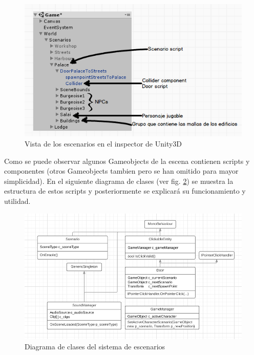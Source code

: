 \begin{figure}[H]
\begin{center}
\includegraphics[scale=1]{imagenes/unityScenarios.png}
\caption{Vista de los escenarios en el inspector de Unity3D}
\label{unityScenarios}
\end{center}
\end{figure}

Como se puede observar algunos Gameobjects de la escena contienen scripts y componentes (otros Gameobjects tambien pero se han omitido para mayor simplicidad). En el siguiente diagrama de clases (ver fig. \ref{sceneClassDiagram}) se muestra la estructura de estos scripts y posteriormente se explicará su funcionamiento y utilidad.

\begin{figure}[H]
\begin{center}
\includegraphics[scale=0.75]{imagenes/sceneClassDiagram.PNG}
\caption{Diagrama de clases del sistema de escenarios}
\label{sceneClassDiagram}
\end{center}
\end{figure}

